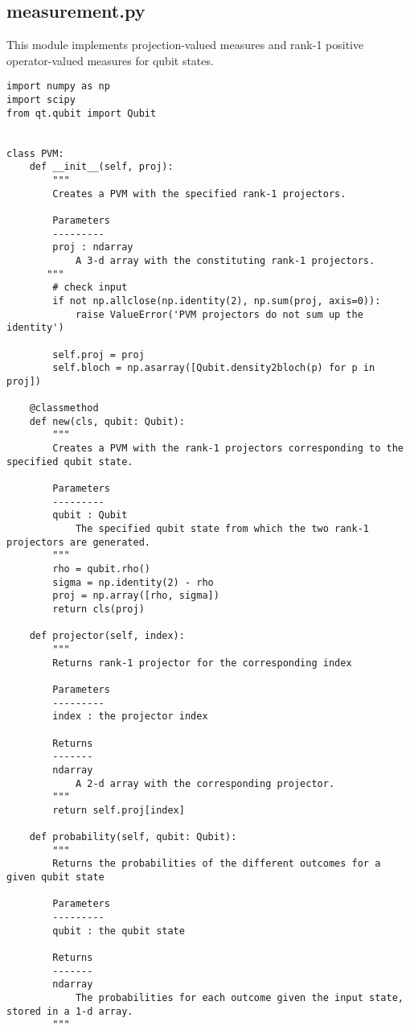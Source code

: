 \subsection{measurement.py}\label{section:listing_measurement}
This module implements projection-valued measures and rank-1 positive operator-valued measures for qubit states. 
\begin{verbatim}
import numpy as np
import scipy
from qt.qubit import Qubit


class PVM:
    def __init__(self, proj):
        """
        Creates a PVM with the specified rank-1 projectors.

        Parameters
        ---------
        proj : ndarray
            A 3-d array with the constituting rank-1 projectors.
       """
        # check input
        if not np.allclose(np.identity(2), np.sum(proj, axis=0)):
            raise ValueError('PVM projectors do not sum up the identity')

        self.proj = proj
        self.bloch = np.asarray([Qubit.density2bloch(p) for p in proj])

    @classmethod
    def new(cls, qubit: Qubit):
        """
        Creates a PVM with the rank-1 projectors corresponding to the specified qubit state.

        Parameters
        ---------
        qubit : Qubit
            The specified qubit state from which the two rank-1 projectors are generated.
        """
        rho = qubit.rho()
        sigma = np.identity(2) - rho
        proj = np.array([rho, sigma])
        return cls(proj)

    def projector(self, index):
        """
        Returns rank-1 projector for the corresponding index

        Parameters
        ---------
        index : the projector index

        Returns
        -------
        ndarray
            A 2-d array with the corresponding projector.
        """
        return self.proj[index]

    def probability(self, qubit: Qubit):
        """
        Returns the probabilities of the different outcomes for a given qubit state

        Parameters
        ---------
        qubit : the qubit state

        Returns
        -------
        ndarray
            The probabilities for each outcome given the input state, stored in a 1-d array.
        """


\end{verbatim}
